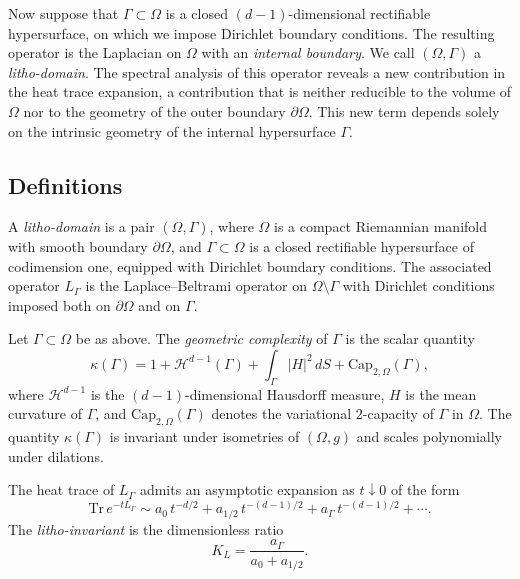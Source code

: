 Now suppose that $\Gamma \subset \Omega$ is a closed $(d-1)$-dimensional rectifiable hypersurface, 
on which we impose Dirichlet boundary conditions. 
The resulting operator is the Laplacian on $\Omega$ with an \emph{internal boundary}. 
We call $(\Omega,\Gamma)$ a \emph{litho-domain}. 
The spectral analysis of this operator reveals a new contribution in the heat trace expansion, 
a contribution that is neither reducible to the volume of $\Omega$ 
nor to the geometry of the outer boundary $\partial \Omega$. 
This new term depends solely on the intrinsic geometry of the internal hypersurface $\Gamma$. 

\subsection{Definitions}

\begin{definition}
A \emph{litho-domain} is a pair $(\Omega,\Gamma)$, 
where $\Omega$ is a compact Riemannian manifold with smooth boundary $\partial \Omega$, 
and $\Gamma \subset \Omega$ is a closed rectifiable hypersurface of codimension one, 
equipped with Dirichlet boundary conditions. 
The associated operator $L_\Gamma$ is the Laplace--Beltrami operator on $\Omega \setminus \Gamma$ 
with Dirichlet conditions imposed both on $\partial\Omega$ and on $\Gamma$. 
\end{definition}

\begin{definition}
Let $\Gamma \subset \Omega$ be as above. 
The \emph{geometric complexity} of $\Gamma$ is the scalar quantity
\begin{equation}\label{eq:kappa}
  \kappa(\Gamma) = 1 
  + \mathcal{H}^{d-1}(\Gamma) 
  + \int_\Gamma |H|^2 \, dS 
  + \mathrm{Cap}_{2,\Omega}(\Gamma),
\end{equation}
where $\mathcal{H}^{d-1}$ is the $(d-1)$-dimensional Hausdorff measure, 
$H$ is the mean curvature of $\Gamma$, 
and $\mathrm{Cap}_{2,\Omega}(\Gamma)$ denotes the variational $2$-capacity of $\Gamma$ in $\Omega$. 
The quantity $\kappa(\Gamma)$ is invariant under isometries of $(\Omega,g)$ 
and scales polynomially under dilations. 
\end{definition}

\begin{definition}
The heat trace of $L_\Gamma$ admits an asymptotic expansion as $t \downarrow 0$ of the form
\begin{equation}\label{eq:heat}
  \mathrm{Tr}\, e^{-tL_\Gamma} 
  \sim a_0 \, t^{-d/2} 
  + a_{1/2}\, t^{-(d-1)/2} 
  + a_\Gamma \, t^{-(d-1)/2} 
  + \cdots.
\end{equation}
The \emph{litho-invariant} is the dimensionless ratio
\begin{equation}\label{eq:kl}
  K_L = \frac{a_\Gamma}{a_0 + a_{1/2}}.
\end{equation}
\end{definition}

